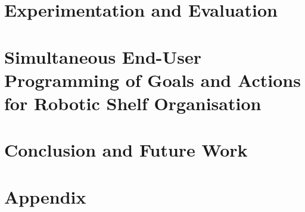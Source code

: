 \documentclass[a4paper,12pt,twoside,openany]{book}
\theoremstyle{definition}
\theoremstyle{remark}
\begin{document}
\chapter{Experimentation and Evaluation}\label{chap:Evaluation}


\chapter{Simultaneous End-User Programming of Goals and Actions for Robotic Shelf Organisation}\label{chap:OrganisingTasks}



\chapter{Conclusion and Future Work}\label{chap:Conclusion}



\clearpage



\chapter{Appendix}\label{chap:Appendix}

\end{document}

